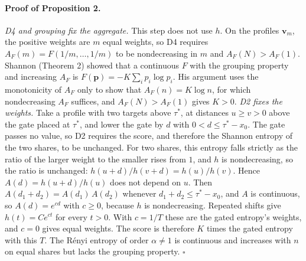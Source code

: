 \documentclass[11pt]{article}
\begin{document}
\paragraph{Proof of Proposition 2.} \emph{D4 and grouping fix the aggregate.}
This step does not use $h$. On the profiles $\mathbf{v}_m$, the positive
weights are $m$ equal weights, so D4 requires $A_F(m) = F(1/m, \ldots, 1/m)$ to
be nondecreasing in $m$ and $A_F(N) > A_F(1)$. Shannon\cite{Shannon1948} (Theorem 2) showed
that a continuous $F$ with the grouping property and increasing $A_F$ is
$F(\mathbf{p}) = -K\sum_i p_i \log p_i$. His argument uses the monotonicity of
$A_F$ only to show that $A_F(n) = K\log n$, for which nondecreasing $A_F$
suffices, and $A_F(N) > A_F(1)$ gives $K > 0$. \emph{D2 fixes the weights.}
Take a profile with two targets above $\tau^*$, at distances $u \geq v > 0$
above the gate placed at $\tau^*$, and lower the gate by $d$ with
$0 < d \leq \tau^* - x_0$. The gate passes no value, so D2 requires the score,
and therefore the Shannon entropy of the two shares, to be unchanged. For two
shares, this entropy falls strictly as the ratio of the larger weight to the
smaller rises from $1$, and $h$ is nondecreasing, so the ratio is unchanged:
$h(u + d)/h(v + d) = h(u)/h(v)$. Hence $A(d) = h(u + d)/h(u)$ does not depend
on $u$. Then $A(d_1 + d_2) = A(d_1)\,A(d_2)$ whenever $d_1 + d_2 \leq \tau^* - x_0$,
and $A$ is continuous, so $A(d) = e^{cd}$ with $c \geq 0$, because $h$ is
nondecreasing. Repeated shifts give $h(t) = C e^{ct}$ for every $t > 0$. With
$c = 1/T$ these are the gated entropy's weights, and $c = 0$ gives equal
weights. The score is therefore $K$ times the gated entropy with this $T$. The
R\'enyi entropy of order $\alpha \neq 1$ is continuous and increases with $n$
on equal shares but lacks the grouping property. $\square$
\end{document}
